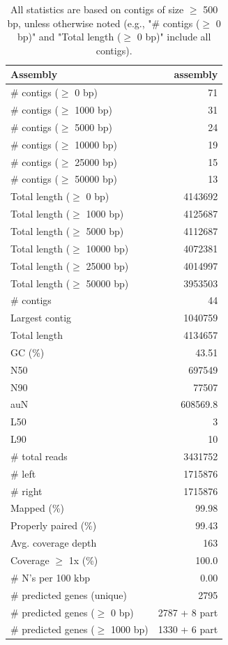 \documentclass[12pt,a4paper]{article}
\begin{document}
\begin{table}[ht]
\begin{center}
\caption{All statistics are based on contigs of size $\geq$ 500 bp, unless otherwise noted (e.g., "\# contigs ($\geq$ 0 bp)" and "Total length ($\geq$ 0 bp)" include all contigs).}
\begin{tabular}{|l*{1}{|r}|}
\hline
Assembly & assembly \\ \hline
\# contigs ($\geq$ 0 bp) & 71 \\ \hline
\# contigs ($\geq$ 1000 bp) & 31 \\ \hline
\# contigs ($\geq$ 5000 bp) & 24 \\ \hline
\# contigs ($\geq$ 10000 bp) & 19 \\ \hline
\# contigs ($\geq$ 25000 bp) & 15 \\ \hline
\# contigs ($\geq$ 50000 bp) & 13 \\ \hline
Total length ($\geq$ 0 bp) & 4143692 \\ \hline
Total length ($\geq$ 1000 bp) & 4125687 \\ \hline
Total length ($\geq$ 5000 bp) & 4112687 \\ \hline
Total length ($\geq$ 10000 bp) & 4072381 \\ \hline
Total length ($\geq$ 25000 bp) & 4014997 \\ \hline
Total length ($\geq$ 50000 bp) & 3953503 \\ \hline
\# contigs & 44 \\ \hline
Largest contig & 1040759 \\ \hline
Total length & 4134657 \\ \hline
GC (\%) & 43.51 \\ \hline
N50 & 697549 \\ \hline
N90 & 77507 \\ \hline
auN & 608569.8 \\ \hline
L50 & 3 \\ \hline
L90 & 10 \\ \hline
\# total reads & 3431752 \\ \hline
\# left & 1715876 \\ \hline
\# right & 1715876 \\ \hline
Mapped (\%) & 99.98 \\ \hline
Properly paired (\%) & 99.43 \\ \hline
Avg. coverage depth & 163 \\ \hline
Coverage $\geq$ 1x (\%) & 100.0 \\ \hline
\# N's per 100 kbp & 0.00 \\ \hline
\# predicted genes (unique) & 2795 \\ \hline
\# predicted genes ($\geq$ 0 bp) & 2787 + 8 part \\ \hline
\# predicted genes ($\geq$ 1000 bp) & 1330 + 6 part \\ \hline
\end{tabular}
\end{center}
\end{table}
\end{document}
